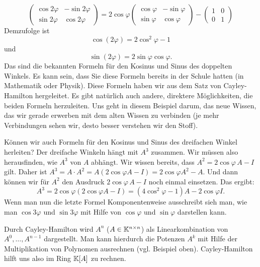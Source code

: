 \begin{bsp}
	\begin{equation*}
		\begin{pmatrix}
			\cos 2\varphi & -\sin 2\varphi \\
			\sin 2\varphi & \cos 2\varphi
		\end{pmatrix} = 2 \cos \varphi \begin{pmatrix}
			\cos \varphi & -\sin \varphi \\
			\sin \varphi & \cos \varphi
		\end{pmatrix} - \begin{pmatrix}
			1 & 0 \\
			0 & 1
		\end{pmatrix}
	\end{equation*}
	Demzufolge ist 
	\[
		 \cos(2\varphi) = 2 \cos^2 \varphi - 1 
	\]
		und 
	\[ 
		\sin(2\varphi) = 2\sin\varphi\cos\varphi . 
	\]
	Das sind die bekannten Formeln für den Kosinus und Sinus des doppelten Winkels. Es kann sein, dass Sie diese Formeln bereits in der Schule hatten (in Mathematik oder Physik). Diese Formeln haben wir aus dem Satz von Cayley-Hamilton hergeleitet. Es gibt natürlich auch andere, direktere Möglichkeiten, die beiden Formeln herzuleiten. Uns geht in diesem Beispiel darum, das neue Wissen, das wir gerade erwerben mit dem alten Wissen zu verbinden (je mehr Verbindungen sehen wir, desto besser verstehen wir den Stoff). 
	
	Können wir auch Formeln für den Kosinus und Sinus des dreifachen Winkel herleiten? Der dreifache Winkeln hängt mit $A^3$ zusammen. Wir müssen also herausfinden, wie $A^3$ von $A$ abhängt. Wir wissen bereits, dass $A^2 =  2 \cos \varphi \, A - I$ gilt. Daher ist $A^3= A \cdot A^2 = A( 2 \cos \varphi A - I ) =   2 \cos \varphi A^2 - A $. Und dann können wir für $A^2$ den Ausdruck $2 \cos \varphi \, A - I $ noch einmal einsetzen. Das ergibt: 
	\[
		A^3 = 2 \cos \varphi (2 \cos \varphi A - I )= (4 \cos^2 \varphi -1) A - 2 \cos \varphi  I. 
	\]
	Wenn man nun die letzte Formel Komponentenweise ausschreibt sieh  man, wie man $\cos 3 \varphi$ und $\sin 3 \varphi$ mit Hilfe von $\cos \varphi$ und $\sin \varphi$ darstellen kann.
\end{bsp}

\begin{bem}
	Durch Cayley-Hamilton wird $ A^n $ ($ A \in \mathbb K^{n \times n} $) als Linearkombination von $ A^0, \ldots, A^{n-1} $ dargestellt. Man kann hierdurch die Potenzen $ A^k $ mit Hilfe der Multiplikation von Polynomen ausrechnen (vgl. Beispiel oben). Cayley-Hamilton hilft uns also im Ring $\mathbb K[A]$ zu rechnen. 
\end{bem}

